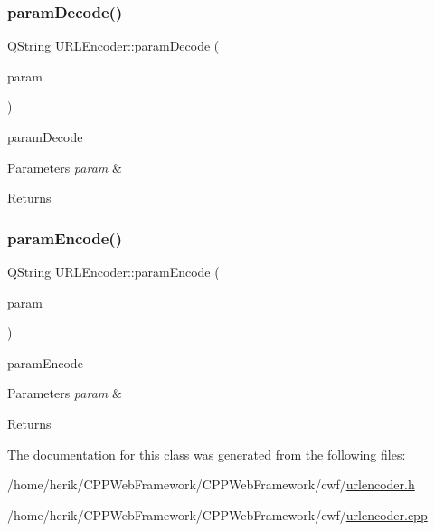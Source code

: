 \subsubsection{\texorpdfstring{param\+Decode()}{paramDecode()}}
{\footnotesize\ttfamily Q\+String U\+R\+L\+Encoder\+::param\+Decode (\begin{DoxyParamCaption}\item[{const Q\+Byte\+Array \&}]{param }\end{DoxyParamCaption})\hspace{0.3cm}{\ttfamily [static]}}



param\+Decode 


\begin{DoxyParams}{Parameters}
{\em param} & \\
\hline
\end{DoxyParams}
\begin{DoxyReturn}{Returns}

\end{DoxyReturn}
\mbox{\label{class_u_r_l_encoder_a1621d8a57c2fd83dabce790a8eeef976}} 
\subsubsection{\texorpdfstring{param\+Encode()}{paramEncode()}}
{\footnotesize\ttfamily Q\+String U\+R\+L\+Encoder\+::param\+Encode (\begin{DoxyParamCaption}\item[{const Q\+Byte\+Array \&}]{param }\end{DoxyParamCaption})\hspace{0.3cm}{\ttfamily [static]}}



param\+Encode 


\begin{DoxyParams}{Parameters}
{\em param} & \\
\hline
\end{DoxyParams}
\begin{DoxyReturn}{Returns}

\end{DoxyReturn}


The documentation for this class was generated from the following files\+:\begin{DoxyCompactItemize}
\item 
/home/herik/\+C\+P\+P\+Web\+Framework/\+C\+P\+P\+Web\+Framework/cwf/\hyperlink{urlencoder_8h}{urlencoder.\+h}\item 
/home/herik/\+C\+P\+P\+Web\+Framework/\+C\+P\+P\+Web\+Framework/cwf/\hyperlink{urlencoder_8cpp}{urlencoder.\+cpp}\end{DoxyCompactItemize}
